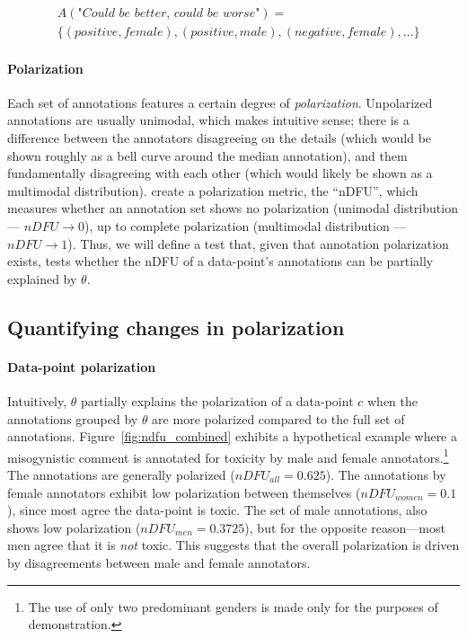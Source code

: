 \documentclass[twocolumn, 8pt]{article}
\begin{document}
\begin{equation}
	\begin{split}
		&A(\textit{"Could be better, could be worse"}) = \\ &\{(\textit{positive}, female), (\textit{positive}, male), (\textit{negative}, female), \ldots\}
	\end{split}
\end{equation}

\paragraph{Polarization} Each set of annotations features a certain degree of \textit{polarization}. Unpolarized annotations are usually unimodal, which makes intuitive sense; there is a difference between the annotators disagreeing on the details (which would be shown roughly as a bell curve around the median annotation), and them fundamentally disagreeing with each other (which would likely be shown as a multimodal distribution). \textcite{pavlopoulos-likas-2024} create a polarization metric, the ``\ac{nDFU}'', which measures whether an annotation set shows no polarization (unimodal distribution --- $nDFU \rightarrow 0$), up to complete polarization (multimodal distribution --- $nDFU \rightarrow 1$). Thus, we will define a test that, given that annotation polarization exists, tests whether the \ac{nDFU} of a data-point's annotations can be partially explained by $\theta$.


\subsection{Quantifying changes in polarization}
\label{ssec:methodology:intuition}

\paragraph{Data-point polarization} Intuitively, $\theta$ partially explains the polarization of a data-point $c$ when the annotations grouped by $\theta$ are more polarized compared to the full set of annotations. Figure~\ref{fig:ndfu_combined} exhibits a hypothetical example where a misogynistic comment is annotated for toxicity by male and female annotators.\footnote{The use of only two predominant genders is made only for the purposes of demonstration.} The annotations are generally polarized ($nDFU_{all} = 0.625$). The annotations by female annotators exhibit low polarization between themselves ($nDFU_{women} = 0.1$), since most agree the data-point is toxic. The set of male annotations, also shows low polarization ($nDFU_{men} = 0.3725$), but for the opposite reason---most men agree that it is \emph{not} toxic. This suggests that the overall polarization is driven by disagreements between male and female annotators.
\end{document}

